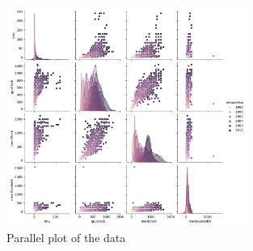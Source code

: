 \documentclass[conference,onecolumn]{IEEEtran}
\begin{document}
\begin{figure}[H]
    \centering
    \includegraphics[width=0.7\textwidth]{Plots/DataPariPlot.png}
    \caption{Parallel plot of the data}
    \label{appdx:parallelPlotOfTheData}
\end{figure}

\newpage


\end{document}
